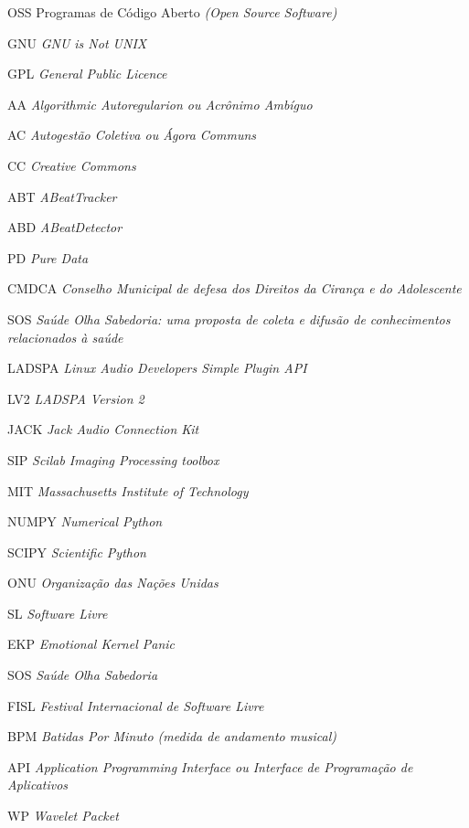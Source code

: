 	\begin{listaespecial}[BIGNAMEWIDTH]
		\item[OSS] Programas de Código Aberto \emph{(Open Source Software)}
		\item[GNU] \emph{GNU is Not UNIX}
		\item[GPL] \emph{General Public Licence}
                \item[AA] \emph{Algorithmic Autoregularion ou Acrônimo Ambíguo}
                \item[AC] \emph{Autogestão Coletiva ou Ágora Communs}
                \item[CC] \emph{Creative Commons}
                \item[ABT] \emph{ABeatTracker}
                \item[ABD] \emph{ABeatDetector}
                \item[PD] \emph{Pure Data}
                \item[CMDCA] \emph{Conselho Municipal de defesa dos Direitos da Cirança e do Adolescente}
                \item[SOS] \emph{Saúde Olha Sabedoria: uma proposta de coleta e difusão de conhecimentos relacionados à saúde}
                \item[LADSPA] \emph{Linux Audio Developers Simple Plugin API}
                \item[LV2] \emph{LADSPA Version 2}
                \item[JACK] \emph{Jack Audio Connection Kit}
                \item[SIP] \emph{Scilab Imaging Processing toolbox}
                \item[MIT] \emph{Massachusetts Institute of Technology}
                \item[NUMPY] \emph{Numerical Python}
                \item[SCIPY] \emph{Scientific Python}
                \item[ONU] \emph{Organização das Nações Unidas}
                \item[SL] \emph{Software Livre}
                \item[EKP] \emph{Emotional Kernel Panic}
                \item[SOS] \emph{Saúde Olha Sabedoria}
                \item[FISL] \emph{Festival Internacional de Software Livre}
                \item[BPM] \emph{Batidas Por Minuto (medida de andamento musical)}
                \item[API] \emph{Application Programming Interface ou Interface de Programação de Aplicativos}
                \item[WP] \emph{Wavelet Packet}


\end{listaespecial}
